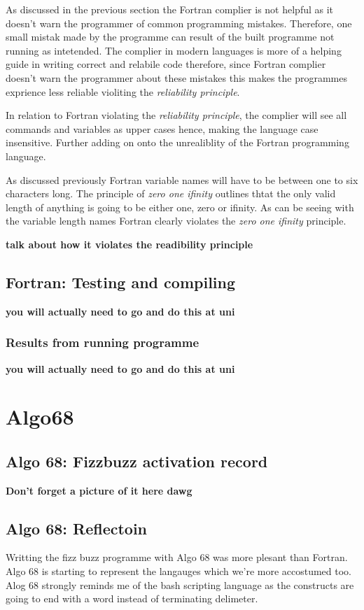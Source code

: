 \documentclass[
	12pt, %
]{fphw}
\begin{document}
As discussed in the previous section the Fortran complier is not helpful as it
doesn't warn the programmer of common programming mistakes. Therefore, one small
mistak made by the programme can result of the built programme not running as
intetended. The complier in modern languages is more of a helping guide in writing
correct and relabile code therefore, since Fortran complier doesn't warn the
programmer about these mistakes this makes the programmes exprience less reliable
violiting the \emph{reliability principle}.\par

In relation to Fortran violating the \emph{reliability principle}, the complier
will see all commands and variables as upper cases hence, making the language
case insensitive. Further adding on onto the unrealiblity of the Fortran
programming language.\par

As discussed previously Fortran variable names will have to be between one to
six characters long. The principle of \emph{zero one ifinity} outlines thtat the
only valid length of anything is going to be either one, zero or ifinity. As can
be seeing with the variable length names Fortran clearly violates the
\emph{zero one ifinity} principle.

\textbf{talk about how it violates the readibility principle}

\subsection{Fortran: Testing and compiling}
\textbf{you will actually need to go and do this at uni}

\subsubsection{Results from running programme}
\textbf{you will actually need to go and do this at uni}

\section{Algo68}

\subsection{Algo 68: Fizzbuzz activation record}
\textbf{Don't forget a picture of it here dawg}

\subsection{Algo 68: Reflectoin}
Writting the fizz buzz programme with Algo 68 was more plesant than Fortran. Algo
68 is starting to represent the langauges which we're more accostumed too. Alog 68
strongly reminds me of the bash scripting language as the constructs are going
to end with a word instead of terminating delimeter. \par
\end{document}
